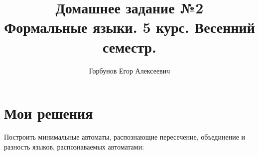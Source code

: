 
\title{Домашнее задание №2 \\ Формальные языки. 5 курс. Весенний семестр.}
\author{Горбунов Егор Алексеевич}


\maketitle

\section{Мои решения}

\begin{task}[1]
Построить минимальные автоматы, распознающие пересечение, объединение и разность языков, распознаваемых автоматами:
\begin{figure}[ht!]
	\centering
\end{figure}
\end{task}

\begin{task}[2]
\end{task}


